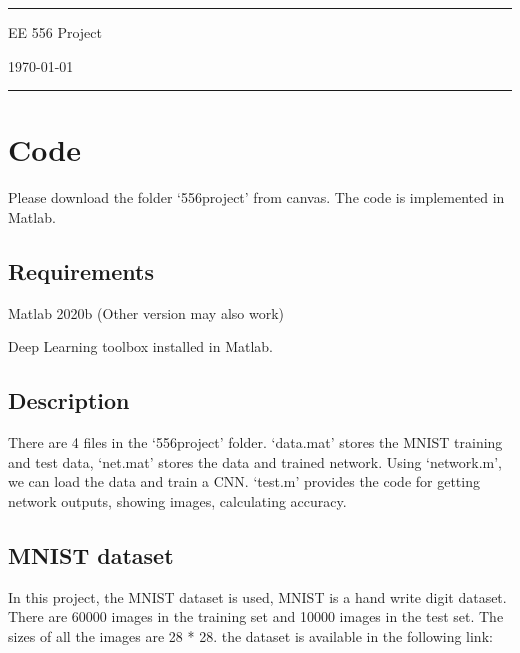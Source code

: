 \documentclass[a4paper]{article}
\begin{document}

\fancyhead[C]{}
\hrule \medskip %
\begin{minipage}{0.295\textwidth} 
\raggedright
\footnotesize

\end{minipage}
\begin{minipage}{0.4\textwidth} 
\centering 
\large 
EE 556 Project\\ 
\normalsize 
\end{minipage}
\begin{minipage}{0.295\textwidth} 
\raggedleft
\today\hfill\\
\end{minipage}
\medskip\hrule 
\bigskip


\section{Code}

Please download the folder `556project' from canvas. The code is implemented in Matlab.

\subsection{Requirements}
Matlab 2020b (Other version may also work)

Deep Learning toolbox installed in Matlab.




\subsection{Description}

There are 4 files in the `556project' folder. `data.mat' stores the MNIST training and test data, `net.mat' stores the data and trained network. Using `network.m', we can load the data and train a CNN. `test.m' provides the code for getting network outputs, showing images, calculating accuracy.

\subsection{MNIST dataset}

In this project, the MNIST dataset is used, MNIST is a hand write digit dataset. There are 60000 images in the training set and 10000 images in the test set. The sizes of all the images are 28 * 28.
the dataset is available in the following link:
\end{document}
